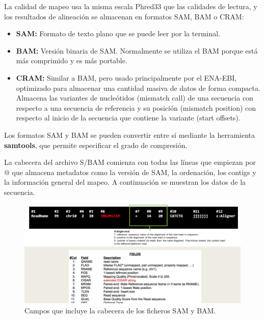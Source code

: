 La calidad de mapeo usa la misma escala Phred33 que las calidades de lectura, y los resultados de alineación se almacenan en formatos SAM, BAM o CRAM:
\begin{itemize}
\item \textbf{SAM:} Formato de texto plano que se puede leer por la terminal.
\item \textbf{BAM:} Versión binaria de SAM. Normalmente se utiliza el BAM porque está más comprimido y es más portable.
\item \textbf{CRAM:} Similar a BAM, pero usado principalmente por el ENA-EBI, optimizado para almacenar una cantidad masiva de datos de forma compacta. Almacena las variantes de nucleótidos (mismatch call) de una secuencia con respecto a una secuencia de referencia y su posición (mismatch position) con respecto al inicio de la secuencia que contiene la variante (start offsets).
\end{itemize}

Los formatos SAM y BAM se pueden convertir entre sí mediante la herramienta \textbf{samtools}, que permite especificar el grado de compresión.

La cabecera del archivo S/BAM comienza con todas las líneas que empiezan por $@$ que almacena metadatos como la versión de SAM, la ordenación, los contigs y la información general del mapeo. A continuación se muestran los datos de la secuencia.
\begin{figure}
\centering
\includegraphics[width = \textwidth]{figs/sam-header.png}
\caption{Campos que incluye la cabecera de los ficheros SAM y BAM.}
\end{figure}

